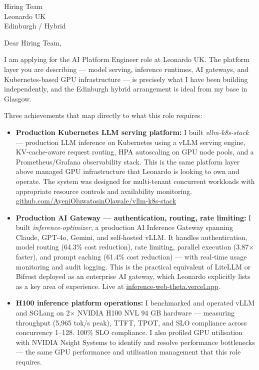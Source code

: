 \documentclass[12pt,a4paper]{letter}
\date{\today}
\begin{document}
\begin{letter}{Hiring Team \\ Leonardo UK \\ Edinburgh / Hybrid}

\opening{Dear Hiring Team,}

I am applying for the AI Platform Engineer role at Leonardo UK. The platform layer you are describing — model serving, inference runtimes, AI gateways, and Kubernetes-based GPU infrastructure — is precisely what I have been building independently, and the Edinburgh hybrid arrangement is ideal from my base in Glasgow.

Three achievements that map directly to what this role requires:

\begin{itemize}
  \item \textbf{Production Kubernetes LLM serving platform:} I built \textit{vllm-k8s-stack} — production LLM inference on Kubernetes using a vLLM serving engine, KV-cache-aware request routing, HPA autoscaling on GPU node pools, and a Prometheus/Grafana observability stack. This is the same platform layer above managed GPU infrastructure that Leonardo is looking to own and operate. The system was designed for multi-tenant concurrent workloads with appropriate resource controls and availability monitoring. \href{https://github.com/AyeniOluwatosinOlawale/vllm-k8s-stack}{github.com/AyeniOluwatosinOlawale/vllm-k8s-stack}

  \item \textbf{Production AI Gateway — authentication, routing, rate limiting:} I built \textit{inference-optimizer}, a production AI Inference Gateway spanning Claude, GPT-4o, Gemini, and self-hosted vLLM. It handles authentication, model routing (64.3\% cost reduction), rate limiting, parallel execution (3.87$\times$ faster), and prompt caching (61.4\% cost reduction) — with real-time usage monitoring and audit logging. This is the practical equivalent of LiteLLM or Bifrost deployed as an enterprise AI gateway, which Leonardo explicitly lists as a key area of experience. Live at \href{https://inference-web-theta.vercel.app}{inference-web-theta.vercel.app}.

  \item \textbf{H100 inference platform operations:} I benchmarked and operated vLLM and SGLang on 2$\times$ NVIDIA H100 NVL 94 GB hardware — measuring throughput (5,965 tok/s peak), TTFT, TPOT, and SLO compliance across concurrency 1--128. 100\% SLO compliance. I also profiled GPU utilisation with NVIDIA Nsight Systems to identify and resolve performance bottlenecks — the same GPU performance and utilisation management that this role requires.
\end{itemize}


\end{letter}
\end{document}
